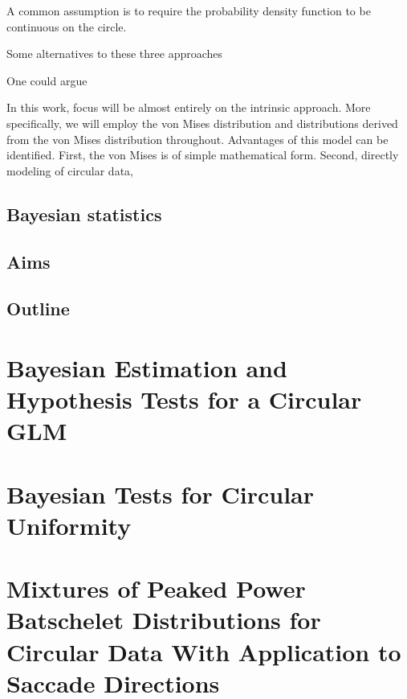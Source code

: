 \documentclass[12pt, a4paper]{book}\usepackage[]{graphicx}\usepackage[]{color}
\begin{document}
A common assumption is to require the probability density function to be continuous on the circle.





Some alternatives to these three approaches

One could argue

In this work, focus will be almost entirely on the intrinsic approach. More specifically, we will employ the von Mises distribution and distributions derived from the von Mises distribution throughout. Advantages of this model can be identified. First, the von Mises is of simple mathematical form. Second, directly modeling of circular data,






\section{Bayesian statistics}




\section{Aims}



\section{Outline}







\chapter{Bayesian Estimation and Hypothesis Tests for a Circular GLM}
\label{circglm}



\chapter{Bayesian Tests for Circular Uniformity}
\label{hypotest}



\chapter{Mixtures of Peaked Power Batschelet Distributions for Circular Data  With Application to Saccade Directions}
\label{flexcmix}

%
%
\end{document}
